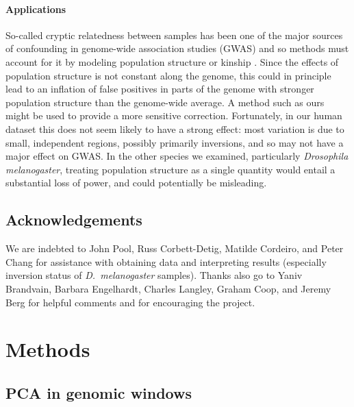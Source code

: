 \documentclass[11pt, oneside]{article}   	%
\begin{document}
\paragraph{Applications}
So-called cryptic relatedness between samples
has been one of the major sources of confounding in genome-wide association studies (GWAS)
and so methods must account for it by modeling population structure or kinship \citep{astle2009population,yang2014advantages}.
Since the effects of population structure is not constant along the genome,
this could in principle lead to an inflation of false positives in parts of the genome
with stronger population structure than the genome-wide average.
A method such as ours might be used to provide a more sensitive correction.
Fortunately, in our human dataset this does not seem likely to have a strong effect:
most variation is due to small, independent regions, possibly primarily inversions,
and so may not have a major effect on GWAS.
In the other species we examined, particularly \textit{Drosophila melanogaster},
treating population structure as a single quantity would entail a substantial loss of power,
and could potentially be misleading.

\subsection*{Acknowledgements}

We are indebted to John Pool, Russ Corbett-Detig, Matilde Cordeiro, and Peter Chang 
for assistance with obtaining data and interpreting results
(especially inversion status of \textit{D.~melanogaster} samples).
Thanks also go to Yaniv Brandvain, Barbara Engelhardt, Charles Langley, Graham Coop, and Jeremy Berg for helpful comments
and for encouraging the project.

\section{Methods}



\subsection{PCA in genomic windows}
\end{document}
